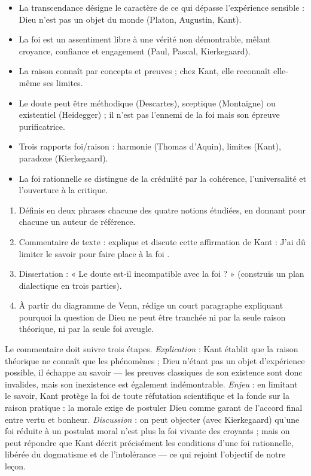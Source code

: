 \documentclass[11pt]{article}
\newcommand{\cle}[1]{{\popxbold\color{popdark}#1}}
\begin{document}
\begin{aretenir}
\begin{itemize}
  \item La \cle{transcendance} désigne le caractère de ce qui dépasse l'expérience sensible : Dieu n'est pas un objet du monde (Platon, Augustin, Kant).
  \item La \cle{foi} est un assentiment libre à une vérité non démontrable, mêlant croyance, confiance et engagement (Paul, Pascal, Kierkegaard).
  \item La \cle{raison} connaît par concepts et preuves ; chez Kant, elle reconnaît elle-même ses limites.
  \item Le \cle{doute} peut être méthodique (Descartes), sceptique (Montaigne) ou existentiel (Heidegger) ; il n'est pas l'ennemi de la foi mais son épreuve purificatrice.
  \item Trois rapports foi/raison : harmonie (Thomas d'Aquin), limites (Kant), paradoxe (Kierkegaard).
  \item La \cle{foi rationnelle} se distingue de la crédulité par la cohérence, l'universalité et l'ouverture à la critique.
\end{itemize}
\end{aretenir}

\begin{exercice}
\begin{enumerate}
  \item Définis en deux phrases chacune des quatre notions étudiées, en donnant pour chacune un auteur de référence.
  \item Commentaire de texte : explique et discute cette affirmation de Kant : \guillemotleft J'ai dû limiter le savoir pour faire place à la foi \guillemotright.
  \item Dissertation : « Le doute est-il incompatible avec la foi ? » (construis un plan dialectique en trois parties).
  \item À partir du diagramme de Venn, rédige un court paragraphe expliquant pourquoi la question de Dieu ne peut être tranchée ni par la seule raison théorique, ni par la seule foi aveugle.
\end{enumerate}
\end{exercice}

\begin{corrige}
Le commentaire doit suivre trois étapes. \emph{Explication} : Kant établit que la raison théorique ne connaît que les phénomènes ; Dieu n'étant pas un objet d'expérience possible, il échappe au savoir — les preuves classiques de son existence sont donc invalides, mais son inexistence est également indémontrable. \emph{Enjeu} : en limitant le savoir, Kant protège la foi de toute réfutation scientifique et la fonde sur la raison pratique : la morale exige de postuler Dieu comme garant de l'accord final entre vertu et bonheur. \emph{Discussion} : on peut objecter (avec Kierkegaard) qu'une foi réduite à un postulat moral n'est plus la foi vivante des croyants ; mais on peut répondre que Kant décrit précisément les conditions d'une foi rationnelle, libérée du dogmatisme et de l'intolérance — ce qui rejoint l'objectif de notre leçon.
\end{corrige}
\end{document}
